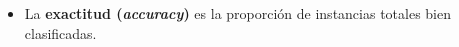 \begin{itemize}
    \item La \textbf{exactitud (\textit{accuracy})} es la proporción de instancias totales bien clasificadas. 
    
    
    


\end{itemize}


